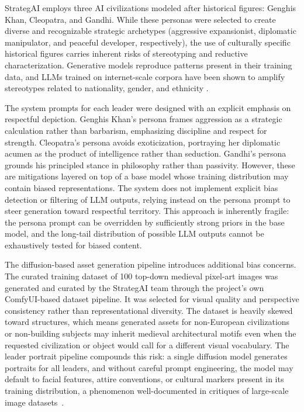 \documentclass[conference]{IEEEtran}
\begin{document}
StrategAI employs three AI civilizations modeled after historical figures: Genghis Khan, Cleopatra, and Gandhi. While these personas were selected to create diverse and recognizable strategic archetypes (aggressive expansionist, diplomatic manipulator, and peaceful developer, respectively), the use of culturally specific historical figures carries inherent risks of stereotyping and reductive characterization. Generative models reproduce patterns present in their training data, and LLMs trained on internet-scale corpora have been shown to amplify stereotypes related to nationality, gender, and ethnicity \cite{bender2021stochastic}.

The system prompts for each leader were designed with an explicit emphasis on respectful depiction. Genghis Khan's persona frames aggression as a strategic calculation rather than barbarism, emphasizing discipline and respect for strength. Cleopatra's persona avoids exoticization, portraying her diplomatic acumen as the product of intelligence rather than seduction. Gandhi's persona grounds his principled stance in philosophy rather than passivity. However, these are mitigations layered on top of a base model whose training distribution may contain biased representations. The system does not implement explicit bias detection or filtering of LLM outputs, relying instead on the persona prompt to steer generation toward respectful territory. This approach is inherently fragile: the persona prompt can be overridden by sufficiently strong priors in the base model, and the long-tail distribution of possible LLM outputs cannot be exhaustively tested for biased content.

The diffusion-based asset generation pipeline introduces additional bias concerns. The curated training dataset of 100 top-down medieval pixel-art images was generated and curated by the StrategAI team through the project's own ComfyUI-based dataset pipeline. It was selected for visual quality and perspective consistency rather than representational diversity. The dataset is heavily skewed toward structures, which means generated assets for non-European civilizations or non-building subjects may inherit medieval architectural motifs even when the requested civilization or object would call for a different visual vocabulary. The leader portrait pipeline compounds this risk: a single diffusion model generates portraits for all leaders, and without careful prompt engineering, the model may default to facial features, attire conventions, or cultural markers present in its training distribution, a phenomenon well-documented in critiques of large-scale image datasets~\cite{crawford2019excavating}.
\end{document}
